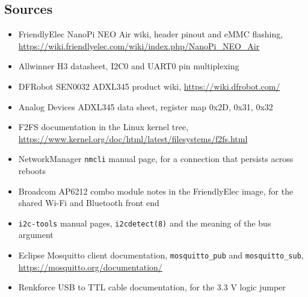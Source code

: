 \subsection*{Sources}

\begin{itemize}
\item FriendlyElec NanoPi NEO Air wiki, header pinout and eMMC flashing, \url{https://wiki.friendlyelec.com/wiki/index.php/NanoPi_NEO_Air}
\item Allwinner H3 datasheet, I2C0 and UART0 pin multiplexing
\item DFRobot SEN0032 ADXL345 product wiki, \url{https://wiki.dfrobot.com/}
\item Analog Devices ADXL345 data sheet, register map 0x2D, 0x31, 0x32
\item F2FS documentation in the Linux kernel tree, \url{https://www.kernel.org/doc/html/latest/filesystems/f2fs.html}
\item NetworkManager \texttt{nmcli} manual page, for a connection that persists across reboots
\item Broadcom AP6212 combo module notes in the FriendlyElec image, for the shared Wi-Fi and Bluetooth front end
\item \texttt{i2c-tools} manual pages, \texttt{i2cdetect(8)} and the meaning of the bus argument
\item Eclipse Mosquitto client documentation, \texttt{mosquitto\_pub} and \texttt{mosquitto\_sub}, \url{https://mosquitto.org/documentation/}
\item Renkforce USB to TTL cable documentation, for the 3.3 V logic jumper
\end{itemize}
